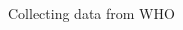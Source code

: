 \documentclass[xcolor=x11names,compress]{beamer}
\renewcommand{\(}{\begin{columns}}
\renewcommand{\)}{\end{columns}}
\newcommand{\<}[1]{\begin{column}{#1}}
\renewcommand{\>}{\end{column}}
\begin{document}
\begin{frame}{Collecting data from WHO}
\begin{columns}[T]
\begin{column}{0.8\textwidth}
\begin{center}
\begin{itemize}

\end{itemize}
\end{center}
\end{column}
\end{columns}
\end{frame}
\end{document}

